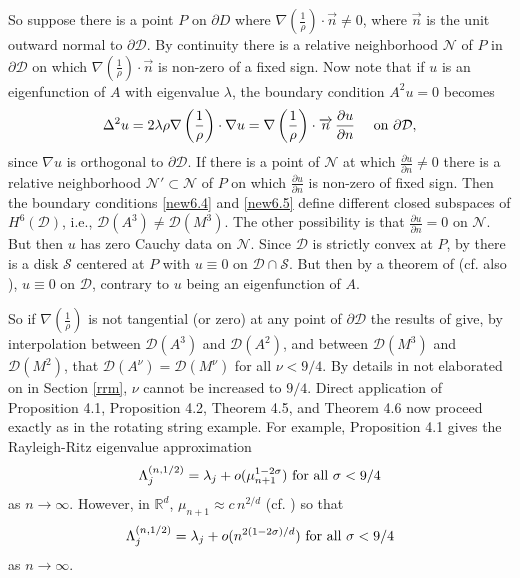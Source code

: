 \documentclass[final]{siamltex}
\numberwithin{equation}{section}
\begin{document}
So suppose there is a point $P$ on $\partial D$ where $\nabla\left(\frac{1}{\rho}\right) \cdot \overrightarrow{n}\neq 0$, where $\overrightarrow{n}$ is the unit outward normal to $\partial \mathcal{D}$. By continuity there is a relative neighborhood $\mathcal{N}$ of $P$ in $\partial \mathcal{D}$ on which $\nabla\left(\frac{1}{\rho}\right) \cdot \overrightarrow{n}$ is non-zero of a fixed sign. Now note that if $u$ is an eigenfunction of $A$ with eigenvalue $\lambda$, the boundary condition $A^2 u=0$ becomes
\begin{equation} \notag
\Delta^2 u = 2 \lambda \rho \nabla\left(\frac{1}{\rho}\right) \cdot \nabla u =
\nabla\left(\frac{1}{\rho}\right) \cdot \overrightarrow{n} \, \frac{\partial u}{\partial n} \quad
\text{ on } \partial \mathcal{D},
\end{equation}
since $\nabla u$ is orthogonal to $\partial \mathcal{D}$. If there is a point of $\mathcal{N}$ at which $\frac{\partial u}{\partial n}\neq 0$ there is a relative neighborhood $\mathcal{N}' \subset \mathcal{N}$ of $P$ on which $\frac{\partial u}{\partial n}$ is non-zero of fixed sign. Then the boundary conditions \eqref{new6.4} and \eqref{new6.5} define different closed subspaces of $H^6(\mathcal{D})$, i.e., $\mathcal{D}(A^3) \neq \mathcal{D}(M^3)$. The other possibility is that $\frac{\partial u}{\partial n}=0$ on $\mathcal{N}$. But then $u$ has zero Cauchy data on $\mathcal{N}$. Since $\mathcal{D}$ is strictly convex at $P$, by \cite{Nirenberg} there is a disk $\mathcal{S}$ centered at $P$ with $u\equiv 0$ on $\mathcal{D}\cap \mathcal{S}$. But then by a theorem of \cite{Muller} (cf. also \cite{Nirenberg}), $u \equiv 0$ on $\mathcal{D}$, contrary to $u$ being an eigenfunction of $A$.

So if $\nabla \left(\frac{1}{\rho}\right)$ is not tangential (or zero) at any point of $\partial \mathcal{D}$ the results of \cite{Grisvard} give, by interpolation between $\mathcal{D}(A^3)$ and $\mathcal{D}(A^2)$, and between $\mathcal{D}(M^3)$ and $\mathcal{D}(M^2)$, that $\mathcal{D}(A^{\nu})=\mathcal{D}(M^{\nu})$ for all $\nu<9/4$. By details in \cite{Grisvard} not elaborated on in Section \ref{rrm}, $\nu$ cannot be increased to $9/4$. Direct application of Proposition 4.1, Proposition 4.2, Theorem 4.5, and Theorem 4.6 now proceed exactly as in the rotating string example. For example, Proposition 4.1 gives the Rayleigh-Ritz eigenvalue approximation
\begin{equation} \notag
\Lambda_j^{(n, 1/2)} = \lambda_j + o(\mu_{n+1}^{1-2 \sigma}) \text{ for all } \sigma <9/4
\end{equation}
as $n \to \infty$. However, in ${\mathbb{R}}^d$, $\mu_{n+1} \approx c \, n^{2/d}$ (cf. \cite{Weyl})
so that
\begin{equation} \notag
\Lambda_j^{(n, 1/2)} = \lambda_j + o(n^{2(1-2 \sigma)/d}) \text{ for all } \sigma <9/4
\end{equation}
as $n \to \infty$.
\end{document}
